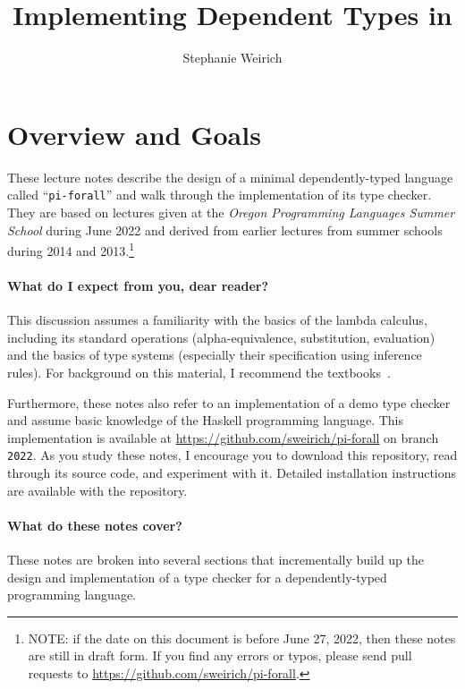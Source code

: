 \documentclass{article}
\title{Implementing Dependent Types in \pif}
\author{Stephanie Weirich}
\newcommand\pif{\texttt{pi-forall}\xspace}
\theoremstyle{definition}
\begin{document}
\maketitle


\section{Overview and Goals}

These lecture notes describe the design of a minimal dependently-typed
language called ``\pif'' and walk through the implementation of its type
checker. They are based on lectures given at the \emph{Oregon Programming
  Languages Summer School} during June 2022 and derived from earlier lectures
from summer schools during 2014 and 2013.\footnote{NOTE: if the date
  on this document is before June 27, 2022, then these notes are still in
  draft form. If you find any errors or typos, please send pull requests
  to \url{https://github.com/sweirich/pi-forall}.}

\paragraph{What do I expect from you, dear reader?} This discussion assumes a
familiarity with the basics of the lambda calculus, including its standard
operations (alpha-equivalence, substitution, evaluation) and the basics of
type systems (especially their specification using inference rules). For
background on this material, I recommend the textbooks~\cite{tapl, pfpl}.

Furthermore, these notes also refer to an implementation of a demo type
checker and assume basic knowledge of the Haskell programming language. This
implementation is available at \url{https://github.com/sweirich/pi-forall} on
branch \texttt{2022}. As you study these notes, I encourage you to download
this repository, read through its source code, and experiment with
it. Detailed installation instructions are available with the repository.

\paragraph{What do these notes cover?}
These notes are broken into several sections that incrementally build up the
design and implementation of a type checker for a dependently-typed
programming language.
\end{document}
